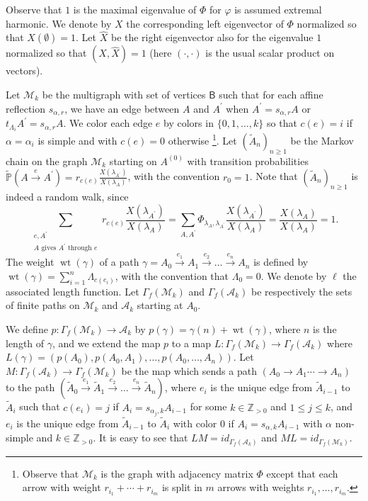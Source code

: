 \documentclass[ALCO,ThmDefs,Unicode,epreuves]{cedram}
\DeclareMathOperator{\wt}{wt}
\begin{document}
Observe that $1$ is the maximal eigenvalue of $\Phi$ for $\varphi$ is assumed
extremal harmonic. We denote by $X$ the corresponding left eigenvector of
$\Phi$ normalized so that $X(\emptyset)=1$. Let $\widehat{X}$ be the right
eigenvector also for the eigenvalue $1$ normalized so that $(X,\widehat{X})=1$
(here $(\cdot,\cdot)$ is the usual scalar product on vectors).

Let $\mathcal{M}_{k}$ be the multigraph with set of vertices $\mathsf{B}$ such
that for each affine reflection $s_{\alpha,r}$, we have an edge between $A$
and $A^{\prime}$ when $A^{\prime}=s_{\alpha,r}A$ or $t_{\Lambda_{i}}A^{\prime
}=s_{\alpha,r}A$. We color each edge $e$ by colors in $\{0,1,\ldots,k\}$ so
that $c(e)=i$ if $\alpha=\alpha_{i}$ is simple and with $c(e)=0$ otherwise
\footnote{Observe that $\mathcal{M}_{k}$ is the graph with adjacency matrix
$\Phi$ except that each arrow with weight $r_{i_{1}}+\cdots+r_{i_{m}}$ is
split in $m$ arrows with weights $r_{i_{1}},\ldots,r_{i_{m}}$.}. Let
$(\widetilde{A}_{n})_{n\geq1}$ be the Markov chain on the graph $\mathcal{M}%
_{k}$ starting on $A^{(0)}$ with transition probabilities $\widetilde
{\mathbb{P}}(A\xrightarrow{e}A^{\prime})=r_{c(e)}\frac{X(\lambda_{A^{\prime}%
})}{X(\lambda_{A})}$, with the convention $r_{0}=1$. Note that $(\widetilde
{A}_{n})_{n\geq1}$ is indeed a random walk, since
\[
\sum_{\substack{e,A^{\prime}\\A\text{ gives }A^{\prime}\text{ through }%
e}}r_{c(e)}\frac{X(\lambda_{A^{\prime}})}{X(\lambda_{A})}=\sum_{A,A^{\prime}%
}\Phi_{\lambda_{A},\lambda_{A^{\prime}}}\frac{X(\lambda_{A^{\prime}}%
)}{X(\lambda_{A})}=\frac{X(\lambda_{A})}{X(\lambda_{A})}=1.
\]
The weight $\wt(\gamma)$ of a path $\gamma=A_{0}%
\xrightarrow{e_{1}}A_{1}\xrightarrow{e_{2}}\dots\xrightarrow{e_{n}}A_{n}$ is
defined by $\wt(\gamma)=\sum_{i=1}^{n}\Lambda_{c(e_{i})}$, with the
convention that $\Lambda_{0}=0$. We denote by $\ell$ the associated length
function. Let $\Gamma_{f}(\mathcal{M}_{k})$ and $\Gamma_{f}(\mathcal{A}_{k})$
be respectively the sets of finite paths on $\mathcal{M}_{k}$ and
$\mathcal{A}_{k}$ starting at $A_{0}$.

We define $p:\Gamma_{f}(\mathcal{M}_{k})\longrightarrow\mathcal{A}_{k}$ by
$p(\gamma)=\gamma(n)+\wt (\gamma)$, where $n$ is the length of $\gamma
$, and we extend the map $p$ to a map $L:\Gamma_{f}(\mathcal{M}_{k}%
)\rightarrow\Gamma_{f}(\mathcal{A}_{k})$ where $L(\gamma)=(p(A_{0}%
),p(A_{0},A_{1}),\ldots,p(A_{0},\ldots,A_{n}))$. Let $M:\Gamma_{f}%
(\mathcal{A}_{k})\rightarrow\Gamma_{f}(\mathcal{M}_{k})$ be the map which
sends a path $(A_{0}\rightarrow A_{1}\cdots\rightarrow A_{n})$ to the path
$(\tilde{A}_{0}\xrightarrow{e_{1}}\tilde{A}_{1}\xrightarrow{e_{2}}\dots
\xrightarrow{e_{n}}\tilde{A}_{n})$, where $e_{i}$ is the unique edge from
$\tilde{A}_{i-1}$ to $\tilde{A}_{i}$ such that $c(e_{i})=j$ if $A_{i}%
=s_{\alpha_{j},k}A_{i-1}$ for some $k\in\mathbb{Z}_{>0}$ and $1\leq j\leq k$,
and $e_{i}$ is the unique edge from $\tilde{A}_{i-1}$ to $\tilde{A}_{i}$ with
color $0$ if $A_{i}=s_{\alpha,k}A_{i-1}$ with $\alpha$ non-simple and
$k\in\mathbb{Z}_{>0}$. It is easy to see that $LM=id_{\Gamma_{f}%
(\mathcal{A}_{k})}$ and $ML=id_{\Gamma_{f}(\mathcal{M}_{k})}$.
\end{document}
